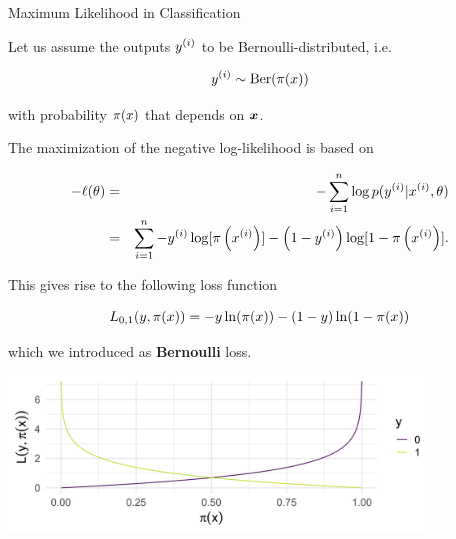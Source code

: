 \begin{vbframe}{Maximum Likelihood in Classification}

Let us assume the outputs $y^{(i)}$ to be Bernoulli-distributed, i.e.  

$$
  y^{(i)} \sim \text{Ber}(\pi(x)) 
$$

with probability $\pi(x)$ that depends on $\bm{x}$. 

\lz 

The maximization of the negative log-likelihood is based on

\begin{eqnarray*}
- \ell(\theta) &=& -\sum_{i=1}^n \log p(y^{(i)} |x^{(i)}, \theta) \\ &=& \sum_{i=1}^n -y^{(i)} \log[\pi\left(x^{(i)}\right)] - \left(1-y^{(i)}\right) \log [1 - \pi\left(x^{(i)}\right)]. \\
\end{eqnarray*}


\framebreak 

This gives rise to the following loss function 

$$
  L_{0, 1}(y, \pi(x)) = -y\ln(\pi(x))-(1-y)\ln(1-\pi(x))
$$

which we introduced as \textbf{Bernoulli} loss. 

\vspace{0.2cm}

\begin{center}
\includegraphics[width = 11cm ]{figure_man/bernoulli-loss.png} \\
\end{center}








\end{vbframe}

